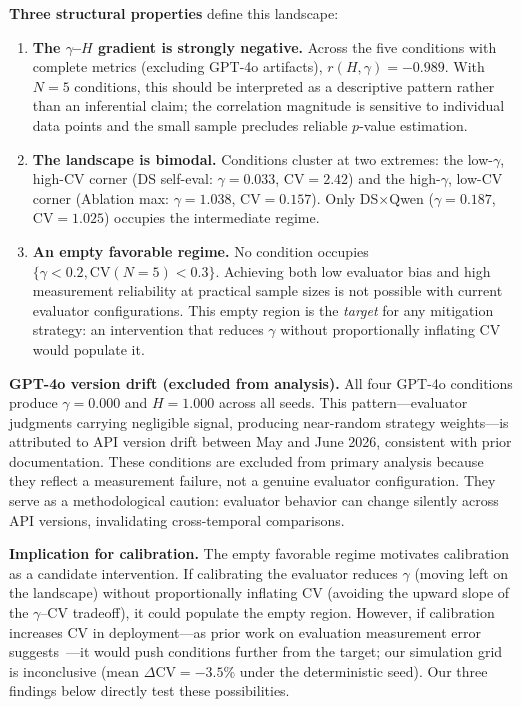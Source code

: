\documentclass[11pt]{article}
\newcommand{\CV}{\ensuremath{\mathrm{CV}}}
\theoremstyle{definition}
\theoremstyle{remark}
\begin{document}
\textbf{Three structural properties} define this landscape:

\begin{enumerate}[leftmargin=*,nosep]
 \item \textbf{The $\gamma$--$H$ gradient is strongly negative.} Across the five conditions with complete metrics (excluding GPT-4o artifacts), $r(H, \gamma) = -0.989$. With $N{=}5$ conditions, this should be interpreted as a descriptive pattern rather than an inferential claim; the correlation magnitude is sensitive to individual data points and the small sample precludes reliable $p$-value estimation.
 \item \textbf{The landscape is bimodal.} Conditions cluster at two extremes: the low-$\gamma$, high-CV corner (DS self-eval: $\gamma{=}0.033$, CV${=}2.42$) and the high-$\gamma$, low-CV corner (Ablation max: $\gamma{=}1.038$, CV${=}0.157$). Only DS$\times$Qwen ($\gamma{=}0.187$, CV${=}1.025$) occupies the intermediate regime.
 \item \textbf{An empty favorable regime.} No condition occupies $\{\gamma < 0.2, \CV(N{=}5) < 0.3\}$. Achieving both low evaluator bias and high measurement reliability at practical sample sizes is not possible with current evaluator configurations. This empty region is the \textit{target} for any mitigation strategy: an intervention that reduces $\gamma$ without proportionally inflating CV would populate it.
\end{enumerate}

\textbf{GPT-4o version drift (excluded from analysis).} All four GPT-4o conditions produce $\gamma{=}0.000$ and $H{=}1.000$ across all seeds. This pattern---evaluator judgments carrying negligible signal, producing near-random strategy weights---is attributed to API version drift between May and June 2026, consistent with prior documentation. These conditions are excluded from primary analysis because they reflect a measurement failure, not a genuine evaluator configuration. They serve as a methodological caution: evaluator behavior can change silently across API versions, invalidating cross-temporal comparisons.

\textbf{Implication for calibration.} The empty favorable regime motivates calibration as a candidate intervention. If calibrating the evaluator reduces $\gamma$ (moving left on the landscape) without proportionally inflating CV (avoiding the upward slope of the $\gamma$--CV tradeoff), it could populate the empty region. However, if calibration increases CV in deployment---as prior work on evaluation measurement error suggests~\citep{messing2026tee}---it would push conditions further from the target; our simulation grid is inconclusive (mean $\Delta\CV = -3.5\%$ under the deterministic seed). Our three findings below directly test these possibilities.
\end{document}
